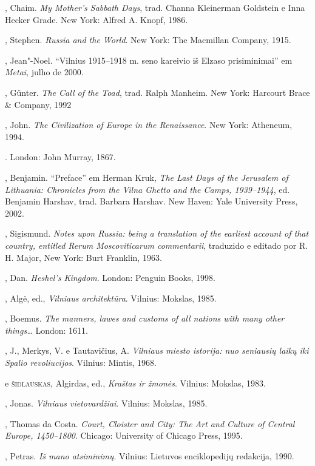 \begin{bibliohedra}
  , Chaim. \emph{My Mother's Sabbath Days}, trad. Channa Kleinerman
  Goldstein e Inna Hecker Grade. New York: Alfred A. Knopf, 1986.

  , Stephen. \emph{Russia and the World}. New York: The Macmillan
  Company, 1915.

  , Jean"-Noel. ``Vilnius 1915--1918 m. seno kareivio iš Elzaso
  prisiminimai'' em \emph{Metai}, julho de 2000.

  , Günter. \emph{The Call of the Toad}, trad. Ralph Manheim. New
  York: Harcourt Brace \& Company, 1992

  , John. \emph{The Civilization of Europe in the Renaissance}. New
  York: Atheneum, 1994.

  . London:
  John Murray, 1867.

  , Benjamin. ``Preface'' em Herman Kruk, \emph{The Last Days of
  the Jerusalem of Lithuania: Chronicles from the Vilna Ghetto and the
  Camps, 1939--1944}, ed. Benjamin Harshav, trad. Barbara Harshav. New
  Haven: Yale University Press, 2002.

  , Sigismund. \emph{Notes upon Russia: being a translation
  of the earliest account of that country, entitled Rerum Moscoviticarum
  commentarii}, traduzido e editado por R.\,H. Major, New York: Burt
  Franklin, 1963.

  , Dan. \emph{Heshel's Kingdom}. London: Penguin Books, 1998.

  , Algė, ed., \emph{Vilniaus architektūra}. Vilnius:
  Mokslas, 1985.

  , Boemus. \emph{The manners, lawes and customs of all nations
  with many other things\ldots{}} London: 1611.

  , J., Merkys, V. e Tautavičius, A. \emph{Vilniaus miesto
  istorija: nuo seniausių laikų iki Spalio revoliucijos}. Vilnius:
  Mintis, 1968.

  \titidem e \textsc{šidlauskas}, Algirdas, ed., \emph{Kraštas ir
  žmonės}. Vilnius: Mokslas, 1983.

  , Jonas. \emph{Vilniaus vietovardžiai}. Vilnius: Mokslas,
  1985.

  , Thomas da Costa. \emph{Court, Cloister and City: The Art and
  Culture of Central Europe, 1450--1800}. Chicago: University of Chicago
  Press, 1995.

  , Petras. \emph{Iš mano atsiminimų}. Vilnius: Lietuvos
  enciklopedijų redakcija, 1990.


\end{bibliohedra}
